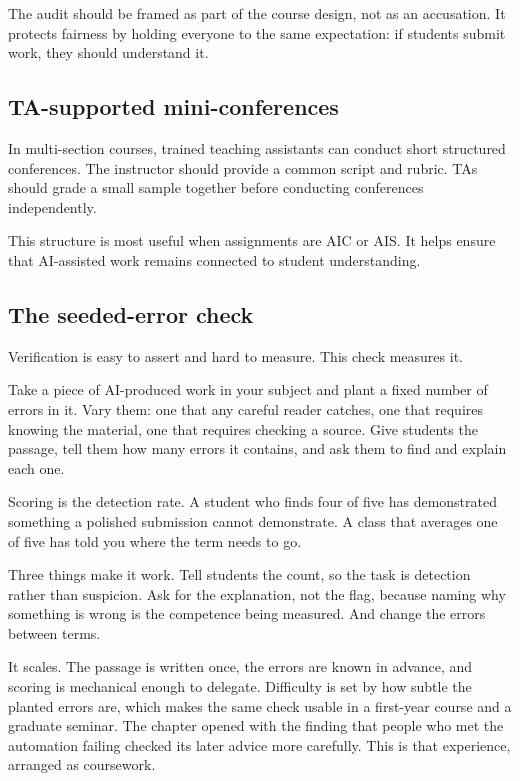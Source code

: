 \documentclass{SIAMbook2023}
\begin{document}
The audit should be framed as part of the course design, not as an accusation. It protects fairness by holding everyone to the same expectation: if students submit work, they should understand it.

\subsection{TA-supported mini-conferences}
\label{i:subsec:ta-mini-conferences}%

In multi-section courses, trained teaching assistants can conduct short structured conferences. The instructor should provide a common script and rubric. TAs should grade a small sample together before conducting conferences independently.

This structure is most useful when assignments are AIC or AIS. It helps ensure that AI-assisted work remains connected to student understanding.

\subsection{The seeded-error check}
\label{i:subsec:seeded-error-check}%

Verification is easy to assert and hard to measure. This check measures it.

Take a piece of AI-produced work in your subject and plant a fixed number of errors in it. Vary them: one that any careful reader catches, one that requires knowing the material, one that requires checking a source. Give students the passage, tell them how many errors it contains, and ask them to find and explain each one.

Scoring is the detection rate. A student who finds four of five has demonstrated something a polished submission cannot demonstrate. A class that averages one of five has told you where the term needs to go.

Three things make it work. Tell students the count, so the task is detection rather than suspicion. Ask for the explanation, not the flag, because naming why something is wrong is the competence being measured. And change the errors between terms.

It scales. The passage is written once, the errors are known in advance, and scoring is mechanical enough to delegate. Difficulty is set by how subtle the planted errors are, which makes the same check usable in a first-year course and a graduate seminar. The chapter opened with the finding that people who met the automation failing checked its later advice more carefully. This is that experience, arranged as coursework.
\end{document}
